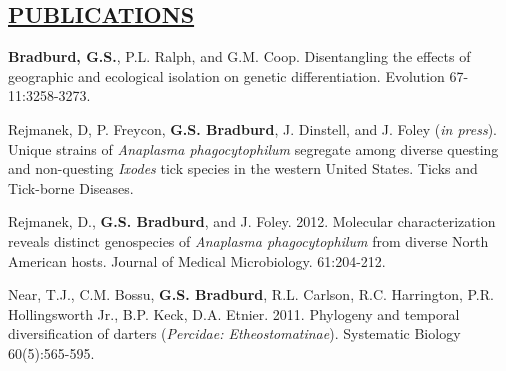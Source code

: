 \documentclass{res}
\begin{document}
\begin{resume}
\section{\underline{PUBLICATIONS}}
\textbf{Bradburd, G.S.}, P.L. Ralph, and G.M. Coop. Disentangling the effects of geographic and ecological isolation on genetic differentiation. Evolution 67-11:3258-3273.

Rejmanek, D, P. Freycon, \textbf{G.S. Bradburd}, J. Dinstell, and J. Foley (\textit{in press}).  Unique strains of \textit{Anaplasma phagocytophilum} segregate among diverse questing and non-questing \textit{Ixodes} tick species in the western United States.  Ticks and Tick-borne Diseases.

Rejmanek, D., \textbf{G.S. Bradburd}, and J. Foley.  2012.  Molecular characterization reveals	distinct genospecies of \textit{Anaplasma phagocytophilum} from diverse North American hosts.	Journal of Medical Microbiology. 61:204-212.

Near, T.J., C.M. Bossu, \textbf{G.S. Bradburd}, R.L. Carlson, R.C. Harrington, P.R. Hollingsworth	Jr., B.P. Keck, D.A. Etnier. 2011.  Phylogeny and temporal diversification of darters (\textit{Percidae: Etheostomatinae}).  Systematic Biology 60(5):565-595.


\end{resume}
\end{document}
